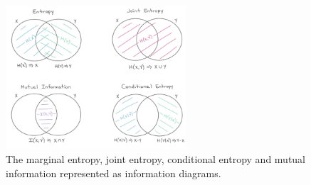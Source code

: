 \begin{figure}[htpb]
    \centering
    \includegraphics[width=0.6\textwidth]{figs/entropy.png}
    \caption{The marginal entropy, joint entropy, conditional entropy and mutual information represented as information diagrams.}
    \label{fig:entropy}
\end{figure}